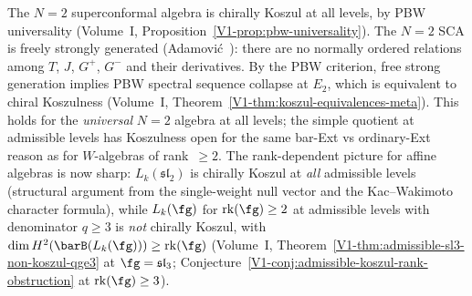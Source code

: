 \begin{remark}[Koszulness of the $N{=}2$ SCA]
\label{rem:N2-koszulness}
The $N{=}2$ superconformal algebra is chirally Koszul at all
levels, by PBW universality
(Volume~I, Proposition~\ref{V1-prop:pbw-universality}).
The $N{=}2$ SCA is freely strongly generated
(Adamovi\'c~\cite{Adamovic99}): there are no normally ordered
relations among $T$, $J$, $G^+$, $G^-$ and their derivatives.
By the PBW criterion, free strong generation implies PBW
spectral sequence collapse at $E_2$, which is equivalent to
chiral Koszulness
(Volume~I, Theorem~\ref{V1-thm:koszul-equivalences-meta}).
This holds for the \emph{universal} $N{=}2$ algebra at all
levels; the simple quotient at admissible levels has Koszulness
open for the same bar-Ext vs ordinary-Ext reason as for
$W$-algebras of rank~$\ge 2$.
The rank-dependent picture for affine algebras is now sharp:
$L_k(\mathfrak{sl}_2)$ is chirally Koszul at \emph{all}
admissible levels (structural argument from the single-weight
null vector and the Kac--Wakimoto character formula), while
$L_k(\fg)$ for $\mathrm{rk}(\fg) \geq 2$ at admissible
levels with denominator $q \geq 3$ is \emph{not} chirally
Koszul, with $\dim H^2(\barB(L_k(\fg))) \geq \mathrm{rk}(\fg)$
(Volume~I,
Theorem~\ref*{V1-thm:admissible-sl3-non-koszul-qge3} at
$\fg = \mathfrak{sl}_3$;
Conjecture~\ref*{V1-conj:admissible-koszul-rank-obstruction}
at $\mathrm{rk}(\fg) \geq 3$).
\end{remark}

